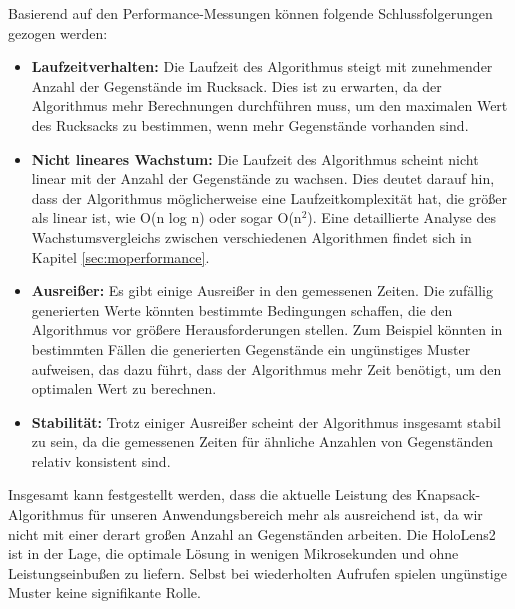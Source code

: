 Basierend auf den Performance-Messungen können folgende Schlussfolgerungen gezogen werden:
\begin{itemize}
\item \textbf{Laufzeitverhalten:} Die Laufzeit des Algorithmus steigt mit zunehmender Anzahl der Gegenstände im Rucksack. Dies ist zu erwarten, da der Algorithmus mehr Berechnungen durchführen muss, um den maximalen Wert des Rucksacks zu bestimmen, wenn mehr Gegenstände vorhanden sind.
\item \textbf{Nicht lineares Wachstum:} Die Laufzeit des Algorithmus scheint nicht linear mit der Anzahl der Gegenstände zu wachsen. Dies deutet darauf hin, dass der Algorithmus möglicherweise eine Laufzeitkomplexität hat, die größer als linear ist, wie O(n log n) oder sogar O(n$^2$). Eine detaillierte Analyse des Wachstumsvergleichs zwischen verschiedenen Algorithmen findet sich in Kapitel \ref{sec:moperformance}.
\item \textbf{Ausreißer:} Es gibt einige Ausreißer in den gemessenen Zeiten. Die zufällig generierten Werte könnten bestimmte Bedingungen schaffen, die den Algorithmus vor größere Herausforderungen stellen. Zum Beispiel könnten in bestimmten Fällen die generierten Gegenstände ein ungünstiges Muster aufweisen, das dazu führt, dass der Algorithmus mehr Zeit benötigt, um den optimalen Wert zu berechnen.
\item \textbf{Stabilität:} Trotz einiger Ausreißer scheint der Algorithmus insgesamt stabil zu sein, da die gemessenen Zeiten für ähnliche Anzahlen von Gegenständen relativ konsistent sind.
\end{itemize}

Insgesamt kann festgestellt werden, dass die aktuelle Leistung des Knapsack-Algorithmus für unseren Anwendungsbereich mehr als ausreichend ist, da wir nicht mit einer derart großen Anzahl an Gegenständen arbeiten. Die HoloLens2 ist in der Lage, die optimale Lösung in wenigen Mikrosekunden und ohne Leistungseinbußen zu liefern. Selbst bei wiederholten Aufrufen spielen ungünstige Muster keine signifikante Rolle.